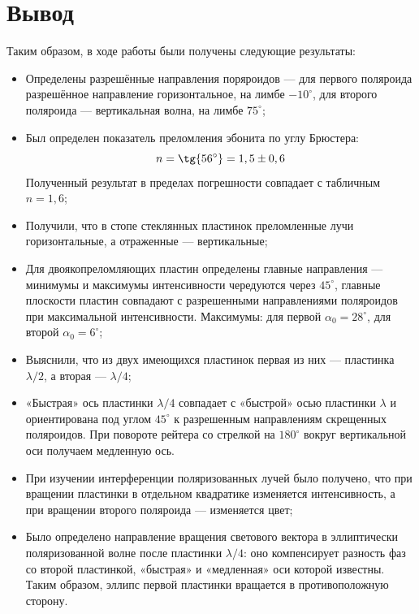 \documentclass[a4paper,12pt]{article} %
\begin{document}
\section{Вывод}
Таким образом, в ходе работы были получены следующие результаты:
\begin{itemize}
\item Определены разрешённые направления поряроидов --- для первого поляроида разрешённое направление горизонтальное, на лимбе $-10^{\circ}$, для второго поляроида --- вертикальная волна, на лимбе $75^{\circ}$;
\item Был определен показатель преломления эбонита по углу Брюстера:
\begin{equation*}
    n = \tg{56^{\circ}} = 1,5 \pm 0,6
\end{equation*}
Полученный результат в пределах погрешности совпадает с табличным $n = 1,6$;
\item Получили, что в стопе стеклянных пластинок преломленные лучи горизонтальные, а отраженные --- вертикальные;
\item Для двоякопреломляющих пластин определены главные направления --- минимумы и
максимумы интенсивности чередуются через $45^{\circ}$, главные плоскости пластин совпадают с разрешенными направлениями поляроидов при максимальной интенсивности. Максимумы: для первой $\alpha_0 = 28^{\circ}$, для второй $\alpha_0 = 6^{\circ}$;
\item Выяснили, что из двух имеющихся пластинок первая из них --- пластинка $\lambda/2$, а вторая --- $\lambda/4$;
\item «Быстрая» ось пластинки $\lambda/4$ совпадает с «быстрой» осью пластинки $\lambda$ и ориентирована под углом $45^{\circ}$ к разрешенным направлениям скрещенных поляроидов. При повороте рейтера со стрелкой на $180^{\circ}$ вокруг вертикальной оси получаем медленную ось.
\item При изучении интерференции поляризованных лучей было получено, что при вращении пластинки в отдельном квадратике изменяется интенсивность, а при вращении второго поляроида --- изменяется цвет;
\item Было определено направление вращения светового вектора в эллиптически поляризованной волне после пластинки $\lambda/4$: оно компенсирует разность фаз со второй пластинкой, «быстрая» и «медленная» оси которой известны. Таким образом, эллипс первой пластинки вращается в противоположную сторону.
\end{itemize}
\end{document}
